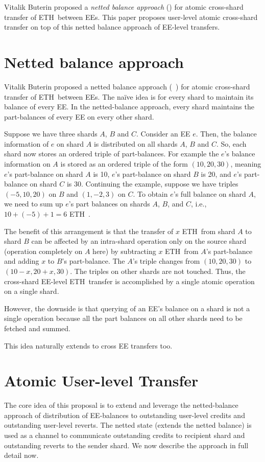 \documentclass{article}
\newcommand{\eth}[0]{ETH~}
\begin{document}
Vitalik Buterin proposed a {\em netted balance approach} (\cite{netted-balance}) for atomic cross-shard transfer of \eth between EEs. This paper proposes user-level atomic cross-shard transfer on top of this netted balance approach of EE-level transfers.

\section{Netted balance approach}
\label{sec:netted-balance}
Vitalik Buterin proposed a netted balance approach (~\cite{netted-balance}) for atomic cross-shard transfer of \eth between EEs. The naïve idea is for every shard to maintain its balance of every EE. In the netted-balance approach, every shard maintains the part-balances of every EE on every other shard. 

Suppose we have three shards $A$, $B$ and $C$. Consider an EE $e$. Then, the balance information of $e$ on shard $A$ is distributed on all shards $A$, $B$ and $C$. So, each shard now stores an ordered triple of part-balances. For example the $e$'s balance information on $A$ is stored as an ordered triple of the form $(10, 20, 30)$, meaning $e$'s part-balance on shard $A$ is 10, $e$'s part-balance on shard $B$ is 20, and $e$'s part-balance on shard $C$ is 30. Continuing the example, suppose we have triples $(-5, 10, 20)$ on $B$ and $(1,-2,3)$ on $C$. To obtain $e$'s full balance on shard $A$, we need to sum up $e$'s part balances on shards $A$, $B$, and $C$, i.e., $10 + (-5) + 1 = 6$ \eth. 

The benefit of this arrangement is that the transfer of $x$ \eth from shard $A$ to shard $B$ can be affected by an intra-shard operation only on the source shard (operation completely on $A$ here) by subtracting $x$ \eth from $A$'s part-balance and adding $x$ to $B$'s part-balance. The $A$'s triple changes from $(10, 20, 30)$ to $(10-x, 20+x, 30)$. The triples on other shards are not touched. Thus, the cross-shard EE-level \eth transfer is accomplished by a single atomic operation on a single shard.

However, the downside is that querying of an EE's balance on a shard is not a single operation because all the part balances on all other shards need to be fetched and summed. 

This idea naturally extends to cross EE transfers too.

\section{Atomic User-level Transfer}
\label{sec:atomic-user}
The core idea of this proposal is to extend and leverage the netted-balance approach of distribution of EE-balances to outstanding user-level credits and outstanding user-level reverts. The netted state (extends the netted balance) is used as a channel to communicate outstanding credits to recipient shard and outstanding reverts to the sender shard. We now describe the approach in full detail now.
\end{document}
